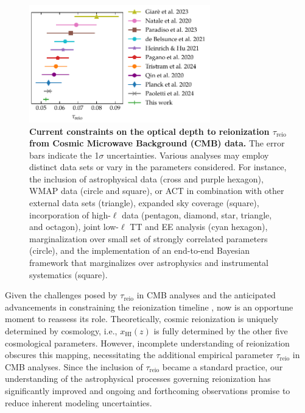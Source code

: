 \documentclass[12pt, a4paper]{article}
\newcommand{\HI}{\mathrm{HI}}
\newcommand{\reio}{\mathrm{reio}}
\begin{document}
\begin{figure}[tb]
\centering
\includegraphics[width=0.7\textwidth]{figs/tau_fig.pdf}
\caption{\textbf{\boldmath Current constraints on the optical depth to
reionization $\tau_\reio$ from Cosmic Microwave Background (CMB) data.}
The error bars indicate the 1$\sigma$ uncertainties.
Various analyses may employ distinct data sets or vary in the parameters
considered.
For instance, the inclusion of astrophysical data \cite{Qin2020,
Paoletti2024} (cross and purple hexagon), WMAP data \cite{Natale2020,
Paradiso2023} (circle and square), or ACT in combination with other
external data sets \cite{Giare2023} (triangle), expanded sky coverage
\cite{Paradiso2023} (square), incorporation of high-$\ell$ data
\cite{Pagano2020, Planck2020a, HeinrichHu2021, Giare2023, Tristram2024}
(pentagon, diamond, star, triangle, and octagon), joint low-$\ell$ TT
and EE analysis \cite{deBelsunce2021} (cyan hexagon), marginalization
over small set of strongly correlated parameters \cite{Natale2020}
(circle), and the implementation of an end-to-end Bayesian framework
that marginalizes over astrophysics and instrumental systematics
\cite{Paradiso2023} (square).}
\label{fig:tau}
\end{figure}

Given the challenges posed by $\tau_\reio$ in CMB analyses and the
anticipated advancements in constraining the reionization
timeline \cite{Montero2021, Hera2022}, now is an opportune moment to
reassess its role.
Theoretically, cosmic reionization is uniquely determined by cosmology,
i.e., $x_\HI(z)$ is fully determined by the other five cosmological
parameters.
However, incomplete understanding of reionization obscures this mapping,
necessitating the additional empirical parameter $\tau_\reio$ in CMB
analyses.
Since the inclusion of $\tau_\reio$ became a standard practice, our
understanding of the astrophysical processes governing reionization has
significantly improved \cite{Gnedin2022, Kannan2022,Murray2020, Fan2023}
and ongoing and forthcoming observations promise to reduce inherent
modeling uncertainties.
\end{document}
